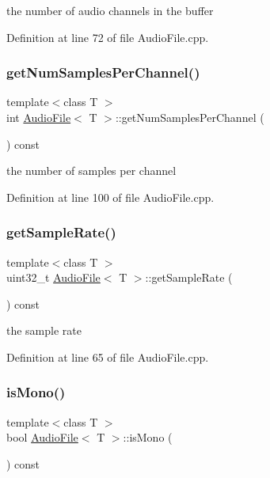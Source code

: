 the number of audio channels in the buffer 

Definition at line 72 of file Audio\+File.\+cpp.

\mbox{\label{classAudioFile_ae1b5b4b7351a79dbf810bb34ede496b9}} 
\subsubsection{\texorpdfstring{get\+Num\+Samples\+Per\+Channel()}{getNumSamplesPerChannel()}}
{\footnotesize\ttfamily template$<$class T $>$ \\
int \hyperlink{classAudioFile}{Audio\+File}$<$ T $>$\+::get\+Num\+Samples\+Per\+Channel (\begin{DoxyParamCaption}{ }\end{DoxyParamCaption}) const}

the number of samples per channel 

Definition at line 100 of file Audio\+File.\+cpp.

\mbox{\label{classAudioFile_a8cd1b082af9db6bd180e4a63edcdefc9}} 
\subsubsection{\texorpdfstring{get\+Sample\+Rate()}{getSampleRate()}}
{\footnotesize\ttfamily template$<$class T $>$ \\
uint32\+\_\+t \hyperlink{classAudioFile}{Audio\+File}$<$ T $>$\+::get\+Sample\+Rate (\begin{DoxyParamCaption}{ }\end{DoxyParamCaption}) const}

the sample rate 

Definition at line 65 of file Audio\+File.\+cpp.

\mbox{\label{classAudioFile_a1057326fd2c2eca7cc7937f811868cf1}} 
\subsubsection{\texorpdfstring{is\+Mono()}{isMono()}}
{\footnotesize\ttfamily template$<$class T $>$ \\
bool \hyperlink{classAudioFile}{Audio\+File}$<$ T $>$\+::is\+Mono (\begin{DoxyParamCaption}{ }\end{DoxyParamCaption}) const}

